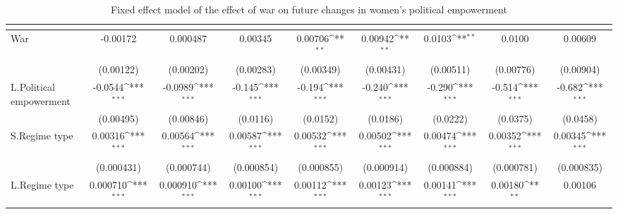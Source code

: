 \begin{table}[htbp]\centering
\def\sym#1{\ifmmode^{#1}\else\(^{#1}\)\fi}
\caption{Fixed effect model of the effect of war on future changes in women's political empowerment\label{tab2}}
\begin{tabular}{l*{8}{c}}
\hline\hline
                    &&&&&&&&\\
\hline
War                 &    -0.00172         &    0.000487         &     0.00345         &     0.00706\sym{**} &     0.00942\sym{**} &      0.0103\sym{**} &      0.0100         &     0.00609         \\
                    &   (0.00122)         &   (0.00202)         &   (0.00283)         &   (0.00349)         &   (0.00431)         &   (0.00511)         &   (0.00776)         &   (0.00904)         \\
[1em]
L.Political empowerment&     -0.0544\sym{***}&     -0.0989\sym{***}&      -0.145\sym{***}&      -0.194\sym{***}&      -0.240\sym{***}&      -0.290\sym{***}&      -0.514\sym{***}&      -0.682\sym{***}\\
                    &   (0.00495)         &   (0.00846)         &    (0.0116)         &    (0.0152)         &    (0.0186)         &    (0.0222)         &    (0.0375)         &    (0.0458)         \\
[1em]
S.Regime type       &     0.00316\sym{***}&     0.00564\sym{***}&     0.00587\sym{***}&     0.00532\sym{***}&     0.00502\sym{***}&     0.00474\sym{***}&     0.00352\sym{***}&     0.00345\sym{***}\\
                    &  (0.000431)         &  (0.000744)         &  (0.000854)         &  (0.000855)         &  (0.000914)         &  (0.000884)         &  (0.000781)         &  (0.000835)         \\
[1em]
L.Regime type       &    0.000710\sym{***}&    0.000910\sym{***}&     0.00100\sym{***}&     0.00112\sym{***}&     0.00123\sym{***}&     0.00141\sym{***}&     0.00180\sym{**} &     0.00106         \\

\end{tabular}
\end{table}
